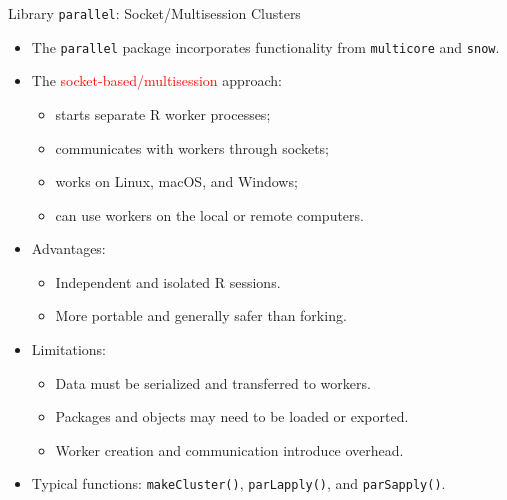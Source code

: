\documentclass[compress,xcolor=table]{beamer}
\newcommand{\CoG}{\textcolor{red}}
\newcommand{\pp}{\pause}
\begin{document}
\begin{frame}{Library \texttt{parallel}: Socket/Multisession Clusters} 
	\footnotesize 
	\begin{itemize} 
		\item The \texttt{parallel} package incorporates functionality from \texttt{multicore} and \texttt{snow}. \pp 
		\item The \CoG{socket-based/multisession} approach: 
		\begin{itemize} 
			\item starts separate R worker processes; 
			\item communicates with workers through sockets; \item works on Linux, macOS, and Windows; 
			\item can use workers on the local or remote computers. 
		\end{itemize} \pp 
		\item Advantages: 
		\begin{itemize} 
			\item Independent and isolated R sessions. 
			\item More portable and generally safer than forking. 
		\end{itemize} \pp 
		\item Limitations: 
		\begin{itemize} 
			\item Data must be serialized and transferred to workers. 
			\item Packages and objects may need to be loaded or exported. 
			\item Worker creation and communication introduce overhead. 
			\end{itemize} \pp 
		\item Typical functions: \texttt{makeCluster()}, \texttt{parLapply()}, and \texttt{parSapply()}. 
	\end{itemize} 
\end{frame}
\end{document}
